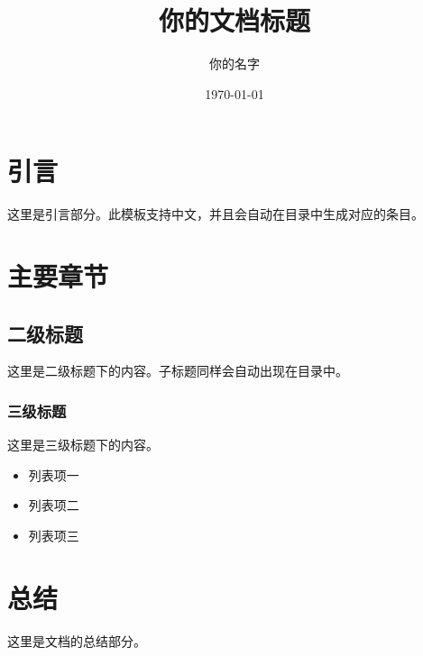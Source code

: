 \documentclass[12pt, a4paper]{ctexart} %
\begin{document}
\title{你的文档标题}
\author{你的名字}
\date{\today} %
\maketitle %

\thispagestyle{empty} %
\newpage

\tableofcontents
\newpage %

\section{引言} %
这里是引言部分。此模板支持中文，并且会自动在目录中生成对应的条目。

\section{主要章节}
\subsection{二级标题} %
这里是二级标题下的内容。子标题同样会自动出现在目录中。

\subsubsection{三级标题} %
这里是三级标题下的内容。
\begin{itemize}
    \item 列表项一
    \item 列表项二
    \item 列表项三
\end{itemize}

\section{总结}
这里是文档的总结部分。
\end{document}
